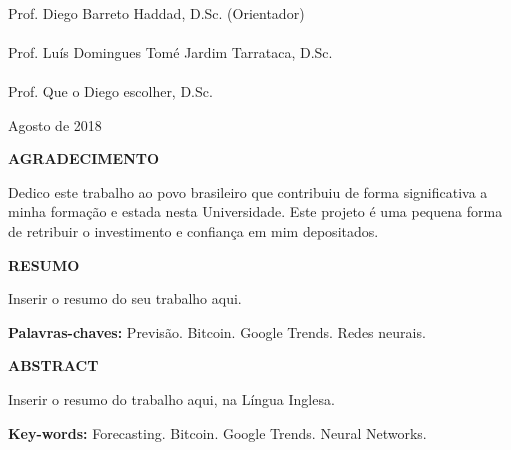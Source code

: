 {\center
\HRule \\
Prof. Diego Barreto Haddad, D.Sc. (Orientador) \\[0.4cm]
\HRule \\
Prof. Luís Domingues Tomé Jardim Tarrataca, D.Sc.\\[0.4cm]
\HRule \\
Prof. Que o Diego escolher, D.Sc.  \\[1.5cm]


\begin{center}
{Agosto de 2018}
\end{center}


}



\newpage


%



\begin{center}
\textbf{\large  AGRADECIMENTO}
\end{center}
      \vspace{0.5cm}

Dedico este trabalho ao povo brasileiro que contribuiu de forma significativa a minha formação e estada nesta Universidade. Este projeto é uma pequena forma de retribuir o investimento e confiança em mim depositados.



\newpage


\begin{center}
\textbf{\large RESUMO}
\end{center}
      \vspace{0.5cm}

Inserir o resumo do seu trabalho aqui.

\begin{flushleft}
{\bf Palavras-chaves:} Previsão. Bitcoin. Google Trends. Redes neurais.
\end{flushleft}

\newpage

\begin{center}
\textbf{\large ABSTRACT}
\end{center}
\vspace{0.5cm}

Inserir o resumo do trabalho aqui, na Língua Inglesa.


\begin{flushleft}
{\bf Key-words:} Forecasting. Bitcoin. Google Trends. Neural Networks.
\end{flushleft}
